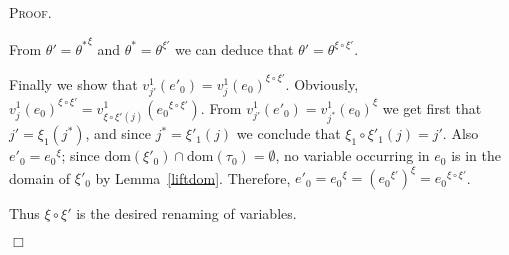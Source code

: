 \documentclass{article}
\newenvironment{proof}{\smallskip\textsc{Proof.}}{\hspace*{\fill}$\Box$}
\newcommand{\dom}{\ensuremath{\mathrm{dom}}}
\newcommand{\renamevar}[2]{\ensuremath{{#1}^{#2}}}
\newcommand{\isrenamevar}[3]{\ensuremath{{#1}=\renamevar{#2}{#3}}}
\begin{document}
\begin{proof}
\begin{enumerate}
\begin{itemize}
From {\isrenamevar{\theta'}{\theta^\ast}\xi} and
{\isrenamevar{\theta^\ast}\theta{\xi'}} we can deduce that
{\isrenamevar{\theta'}\theta{\xi\circ\xi'}}.

Finally we show that {\isrenamevar{v^1_{j'}(e'_0)}{v^1_j(e_0)}{\xi\circ\xi'}}.
Obviously, $\renamevar{v^1_j(e_0)}{\xi\circ\xi'}=%
v^1_{\xi\circ\xi'(j)}(\renamevar{e_0}{\xi\circ\xi'})$.
From {\isrenamevar{v^1_{j'}(e'_0)}{v^1_{j^\ast}(e_0)}\xi} we get first
that $j'=\xi_1(j^\ast)$, and since $j^\ast=\xi'_1(j)$ we conclude that
$\xi_1\circ\xi'_1(j)=j'$.  Also {\isrenamevar{e'_0}{e_0}\xi}; since
$\dom(\xi'_0)\cap\dom(\tau_0)=\emptyset$, no variable occurring in
$e_0$ is in the domain of $\xi'_0$ by Lemma~\ref{liftdom}.
Therefore,
$e'_0=\renamevar{e_0}\xi=\renamevar{(\renamevar{e_0}{\xi'})}\xi=%
\renamevar{e_0}{\xi\circ\xi'}$.
\end{itemize}
Thus $\xi\circ\xi'$ is the desired renaming of variables.
\end{enumerate}
\end{proof}
\end{document}
